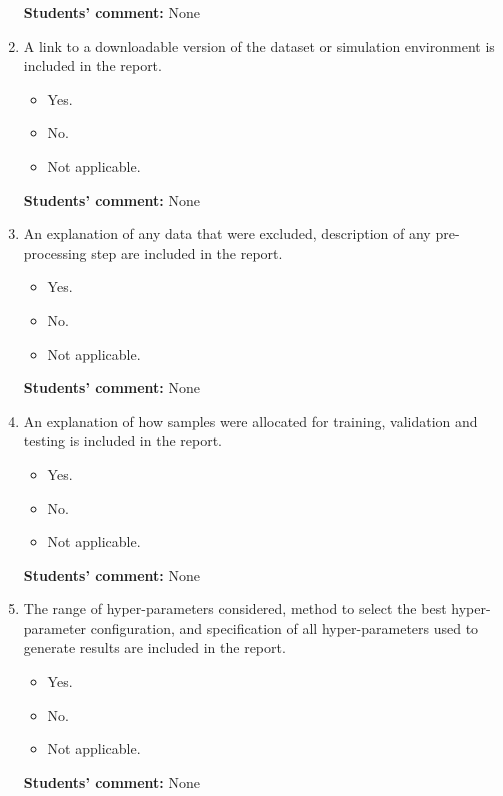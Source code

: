 \documentclass{article}
\begin{document}
\begin{enumerate}
    \textbf{Students' comment:} None

  \item A link to a downloadable version of the dataset or simulation environment is included in the report.
    \begin{itemize}
      \item [\faSquareO] Yes.
      \item [\faSquareO] No.
      \item [\faSquareO] Not applicable.
    \end{itemize}

    \textbf{Students' comment:} None

  \item An explanation of any data that were excluded, description of any pre-processing step are included in the report.
    \begin{itemize}
      \item [\faSquareO] Yes.
      \item [\faSquareO] No.
      \item [\faSquareO] Not applicable.
    \end{itemize}

    \textbf{Students' comment:} None

  \item An explanation of how samples were allocated for training, validation and testing is included in the report.
    \begin{itemize}
      \item [\faSquareO] Yes.
      \item [\faSquareO] No.
      \item [\faSquareO] Not applicable.
    \end{itemize}

    \textbf{Students' comment:} None

  \item The range of hyper-parameters considered, method to select the best hyper-parameter
    configuration, and specification of all hyper-parameters used to generate results are included in the report.
    \begin{itemize}
      \item [\faSquareO] Yes.
      \item [\faSquareO] No.
      \item [\faSquareO] Not applicable.
    \end{itemize}

    \textbf{Students' comment:} None


\end{enumerate}
\end{document}
